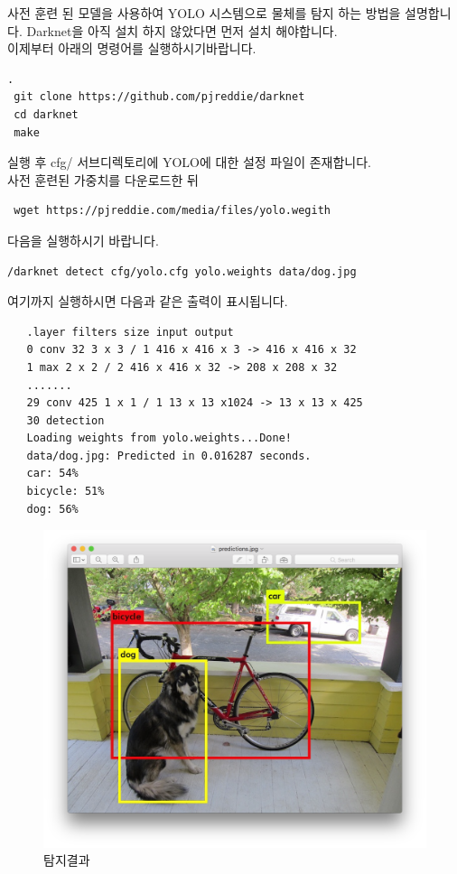 \documentclass{article}
\begin{document}
\indent 사전 훈련 된 모델을 사용하여 YOLO 시스템으로 물체를 탐지 하는 방법을 설명합니다. 
Darknet을 아직 설치 하지 않았다면 먼저 설치 해야합니다. \\
이제부터 아래의 명령어를 실행하시기바랍니다.\\
\begin{lstlisting}.
 git clone https://github.com/pjreddie/darknet
 cd darknet 
 make
\end{lstlisting}
실행 후 cfg/ 서브디렉토리에 YOLO에 대한 설정 파일이 존재합니다. 
\\사전 훈련된 가중치를 다운로드한 뒤
\begin{lstlisting}
 wget https://pjreddie.com/media/files/yolo.wegith
\end{lstlisting}
다음을 실행하시기 바랍니다.
\begin{lstlisting}
/darknet detect cfg/yolo.cfg yolo.weights data/dog.jpg 
\end{lstlisting}
여기까지 실행하시면 다음과 같은 출력이 표시됩니다.\\
\begin{lstlisting}
   .layer filters size input output 
   0 conv 32 3 x 3 / 1 416 x 416 x 3 -> 416 x 416 x 32 
   1 max 2 x 2 / 2 416 x 416 x 32 -> 208 x 208 x 32 
   ....... 
   29 conv 425 1 x 1 / 1 13 x 13 x1024 -> 13 x 13 x 425 
   30 detection 
   Loading weights from yolo.weights...Done! 
   data/dog.jpg: Predicted in 0.016287 seconds. 
   car: 54% 
   bicycle: 51% 
   dog: 56% 
\end{lstlisting}

\begin{figure}[h!]
\centering
\includegraphics[scale=0.2]{ResultIMAGE.png}
\caption{탐지결과}
\label{fig:result}
\end{figure}
\end{document}
